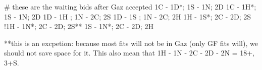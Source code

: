 # these are the waiting bids after Gaz accepted
1C - 1D*; 1S - 1N; 2D
1C - 1H*; 1S - 1N; 2D   
1D - 1H ; 1N - 2C; 2S
1D - 1S ; 1N - 2C; 2H
1H - 1S*; 2C - 2D; 2S
!1H - 1N*; 2C - 2D; 2S**
1S - 1N*; 2C - 2D; 2H

**this is an excpetion: because most fits will not be in Gaz (only GF fits will), we should not save space for it. This also mean that 1H - 1N - 2C - 2D - 2N = 18+, 3+S.